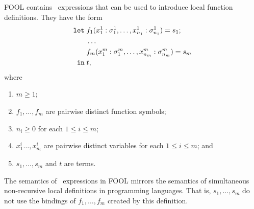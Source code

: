 FOOL contains \LETIN\ expressions that can be used to introduce local function definitions. They have the form
\begin{equation}\label{eq:let}
\begin{aligned}
\mathtt{let}\;&{f_1(x^1_1:\sigma^1_1,\ldots,x^1_{n_1}:\sigma^1_{n_1})}={s_1};\\
              &\ldots\\
              &{f_m(x^m_1:\sigma^m_1,\ldots,x^m_{n_m}:\sigma^m_{n_m})}={s_m}\\
 \mathtt{in}\;&t,
\end{aligned}
\end{equation}
where
\begin{enumerate}
  \item $m \geq 1$;
  \item $f_1,\ldots,f_m$ are pairwise distinct function symbols;
  \item $n_i \geq 0$ for each $1 \leq i \leq m$;
  \item $x^i_1\ldots,x^i_{n_i}$ are pairwise distinct variables for each $1 \leq i \leq m$; and
  \item $s_1,\ldots,s_m$ and $t$ are terms.
\end{enumerate}


The semantics of \LETIN\ expressions in FOOL mirrors the semantics of simultaneous non-recursive local definitions in programming languages. That is, $s_1,\ldots,s_m$ do not use the bindings of $f_1,\ldots,f_m$ created by this definition.

